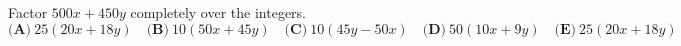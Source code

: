 Factor $500x+450y$ completely over the integers.
\[\textbf{(A)}~25(20x+18y)\quad\textbf{(B)}~10(50x+45y)\quad\textbf{(C)}~10(45y-50x)\quad\textbf{(D)}~50(10x+9y)\quad\textbf{(E)}~25(20x+18y)\]
